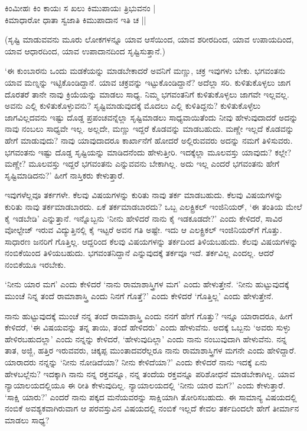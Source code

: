 \begin{shloka}
ಕಿಂಮೀಹಃ ಕಿಂ ಕಾಯಃ ಸ ಖಲು ಕಿಮುಪಾಯಃ ತ್ರಿಭುವನಂ |\\
ಕಿಮಾಧಾರೋ ಧಾತಾ ಸ್ವಜಾತಿ ಕಿಮುಪಾದಾನ ಇತಿ ಚ ||
\end{shloka}

(ಸೃಷ್ಟಿ ಮಾಡುವವನು ಮೂರು ಲೋಕಗಳನ್ನೂ ಯಾವ ಆಸೆಯಿಂದ, ಯಾವ ಶರೀರದಿಂದ, ಯಾವ ಉಪಾಯದಿಂದ, ಯಾವ ಆಧಾರದಿಂದ, ಯಾವ ಉಪಾದಾನದಿಂದ ಸೃಷ್ಟಿಸುತ್ತಾನೆ.)

`ಈ ಕುಂಬಾರನು ಒಂದು ಮಡಕೆಯನ್ನು ಮಾಡಬೇಕಾದರೆ ಅವನಿಗೆ ಮಣ್ಣು, ಚಕ್ರ ಇವುಗಳು ಬೇಕು. ಭಗವಂತನು ಯಾವ ಮಣ್ನನ್ನು ಇಟ್ಟಿಕೊಂಡಿದ್ದಾನೆ. ಯಾವ ಚಕ್ರವನ್ನು ಇಟ್ಟುಕೊಂಡಿದ್ದಾನೆ? ಅದೆಲ್ಲಾ ಸರಿ. ಕುಳಿತುಕೊಳ್ಳಲು ಜಾಗ ದೊರತರೆ ತಾನೇ ನಾವು ಕ್ರಿಯೆಯನ್ನು ಮಾಡಲು ಸಾಧ್ಯ. ನಿಮ್ಮ ಭಗವಂತನಿಗೆ ಕುಳಿತುಕೊಳ್ಳಲು ಜಾಗವೇ ಇಲ್ಲವಲ್ಲ. ಅವನು ಎಲ್ಲಿ ಕುಳಿತುಕೊಳ್ಳುವನು? ಸೃಷ್ಟಿಮಾಡುವುದಕ್ಕೆ ಮೊದಲು ಎಲ್ಲಿ ಕುಳಿತಿದ್ದನು? ಕುಳಿತುಕೊಳ್ಳೆಲು ಜಾಗವಿಲ್ಲದವನು ಇಷ್ಟು ದೊಡ್ಡ ಪ್ರಪಂಚವನ್ನೆಲ್ಲಾ ಸೃಷ್ಟಿಮಾಡಲು ಸಾಧ್ಯವಾಯಿತೆಂದು ನೀವು ಹೇಳುವುದಾದರೆ ಅದನ್ನು ನಾವು ನಂಬಲು ಸಾಧ್ಯವೇ ಇಲ್ಲ. ಅಲ್ಲದೇ, ಮಣ್ಣು ಇದ್ದರೆ ಕೊಡವನ್ನು ಮಾಡಬಹುದು. ಮಣ್ಣೇ ಇಲ್ಲದೆ ಕೊಡವನ್ನು ಹೇಗೆ ಮಾಡುವುದು? ನಾವು ಯಾವುದಾದರೂ ಕಾರ್ಖಾನೆಗೆ ಹೋದರೆ ಅಲ್ಲಿರುವವರು ಅದನ್ನು ನಮಗೆ ತಿಳಿಸುವರು. ಭಗವಂತನು ಇಷ್ಟು ದೊಡ್ಡ ಸೃಷ್ಟಿಯನ್ನು ಮಾಡಿದನೆಂದು ಹೇಳುತ್ತೀರಿ. ಇದಕ್ಕೆಲ್ಲಾ ಮೂಲವಸ್ತು ಯಾವುದು? ಕಲ್ಲೇ? ಮಣ್ಣೇ? ಮೂಲವಸ್ತು ಇದ್ದರೆ ಭಗವಂತನು ಎನ್ನುವವನು ಬೇಕಾಗಿಲ್ಲ. ಅದು ಇಲ್ಲ ಎಂದರೆ ಭಗವಂತನು ಹೇಗೆ ಸೃಷ್ಟಿಮಾಡಿದನು?' ಹೀಗೆ ನಾಸ್ತಿಕರು ಕೇಳುತ್ತಾರೆ.

ಇವುಗಳೆಲ್ಲವೂ ತರ್ಕಗಳೇ. ಕೆಲವು ವಿಷಯಗಳನ್ನು ಕುರಿತು ನಾವು ತರ್ಕ ಮಾಡಬಹುದು. ಕೆಲವು ವಿಷಯಗಳನ್ನು ಕುರಿತು ನಾವು ತರ್ಕಮಾಡಬಾರದು. ಏಕೆ ತರ್ಕಮಾಡಬಾರದು? ಒಬ್ಬ ಎಲಕ್ಟ್ರಿಕಲ್ ಇಂಜಿನಿಯರ್, `ಈ ತಂತಿಯ ಮೇಲೆ ಕೈ ಇಡಬೇಡಿ' ಎನ್ನುತ್ತಾನೆ. ಇನ್ನೊಬ್ಬನು `ನೀನು ಹೇಳಿದರೆ ನಾನು ಕೈ ಇಡಕೂಡದೇ?' ಎಂದು ಕೇಳಿದರೆ, ಸಾವಿರ ವೋಲ್ಟೇಜ್ ಇರುವ ವಿದ್ಯುತ್ತಿನಲ್ಲಿ ಕೈ ಇಟ್ಟರೆ ಅವನ ಗತಿ ಅಷ್ಟೇ. ಇದು ಆ ಎಲಕ್ಟ್ರಿಕಲ್ ಇಂಜಿನಿಯರ್‌ಗೆ ಗೊತ್ತು. ಸಾಧಾರಣ ಜನರಿಗೆ ಗೊತ್ತಿಲ್ಲ. ಆದ್ದರಿಂದ ಕೆಲವು ವಿಷಯಗಳನ್ನು ತರ್ಕದಿಂದ ತಿಳಿಯಬಹುದು. ಕೆಲವು ವಿಷಯಗಳನ್ನು ನಂಬಿಕೆಯಿಂದ ತಿಳಿಯಬಹುದು. ಭಗವಂತನಿದ್ದಾನೆ ಎನ್ನುವುದಕ್ಕೆ ತರ್ಕವೂ ಇದೆ. ತರ್ಕವಿಲ್ಲ ಎಂದಲ್ಲ. ಆದರೆ ನಂಬಿಕೆಯೂ ಇರಬೇಕು.

`ನೀನು ಯಾರ ಮಗ' ಎಂದು ಕೇಳಿದರೆ `ನಾನು ರಾಮಾಶಾಸ್ತ್ರಿಗಳ ಮಗ' ಎಂದು ಹೇಳುತ್ತೇನೆ. `ನೀನು ಹುಟ್ಟುವುದಕ್ಕೆ ಮುಂಚೆ ನಿನ್ನ ತಂದೆ ರಾಮಾಶಾಸ್ತ್ರಿ ಎಂದು ನಿನಗೆ ಗೊತ್ತೆ?' ಎಂದು ಕೇಳಿದರೆ `ಗೊತ್ತಿಲ್ಲ' ಎಂದು ಹೇಳುತ್ತೇನೆ.

ನಾನು ಹುಟ್ಟುವುದಕ್ಕೆ ಮುಂಚೆ ನನ್ನ ತಂದೆ ರಾಮಾಶಾಸ್ತ್ರಿ ಎಂದು ನನಗೆ ಹೇಗೆ ಗೊತ್ತು? ಇನ್ನೂ ಯಾರಾದರೂ, ಹೀಗೆ ಕೇಳಿದರೆ, `ಈ ವಿಷಯವನ್ನು ತನ್ನ ತಾಯಿ, ತಂದೆ ಹೇಳಿದರು' ಎಂದು ಹೇಳುವೆನು. ಅದಕ್ಕೆ ಒಬ್ಬನು `ಅವರು ಸುಳ್ಳು ಹೇಳಿರಬಹುದಲ್ಲಾ' ಎಂದು ನನ್ನನ್ನು ಕೇಳಿದರೆ, `ಹೇಳುವುದಿಲ್ಲಾ' ಎಂದು ನಾನು ನಂಬುವುದಾಗಿ ಹೇಳುವೆನು. ನನ್ನ ತಾತ, ಅಜ್ಜಿ, ಹತ್ತಿರ ಇರುವವರು, ಚಿಕ್ಕಪ್ಪ ಮುಂತಾದವರೆಲ್ಲರೂ ನಾನು ರಾಮಾಶಾಸ್ತ್ರಿಗಳ ಮಗನೇ ಎಂದು ಹೇಳಿದ್ದಾರೆ. ಯಾರಾದರು ನನ್ನನ್ನು `ನೀನು ನೋಡಿದೆಯಾ? ನೀನು ಕೇಳಿದೆಯಾ?' ಎಂದು ಕೇಳಿದರೆ ನಾನು ಇದಕ್ಕೆ ಏನು ಹೇಳಬಲ್ಲೆನು? ಇದಕ್ಕಾಗಿ ನಾನು ನನ್ನ ರಕ್ತವನ್ನೂ, ನನ್ನ ತಂದೆಯ ರಕ್ತವನ್ನೂ ಪರಿಶೋಧನೆ ಮಾಡಬೇಕಾಗಿಲ್ಲ. ಯಾವ ನ್ಯಾಯಾಲಯದಲ್ಲಿಯೂ ಈ ರೀತಿ ಕೇಳುವುದಿಲ್ಲ. ನ್ಯಾಯಾಲಯದಲ್ಲಿ `ನೀನು ಯಾರ ಮಗ?' ಎಂದು ಕೇಳುತ್ತಾರೆ. `ಸಾಕ್ಷಿ ಯಾರು?' ಎಂದರೆ ನಾನು ಪಕ್ಕದ ಮನೆಯವರನ್ನು ಸಾಕ್ಷಿಯಾಗಿ ತೋರಿಸಬಹುದು. ಈ ಸಾಮಾನ್ಯ ವಿಷಯದಲ್ಲಿ ನಂಬಿಕೆ ಅವಶ್ಯಕವಾಗಿರುವಾಗ ಆ ಪರವಸ್ತುವಿನ ವಿಷಯದಲ್ಲಿ ನಂಬಿಕೆ ಇಲ್ಲದೆ ಕೇವಲ ತರ್ಕದಿಂದಲೇ ಹೇಗೆ ತೀರ್ಮಾನ ಮಾಡಲು ಸಾಧ್ಯ?

